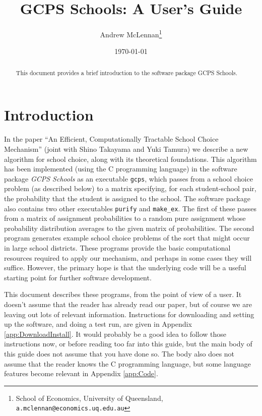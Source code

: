 \documentclass[12pt]{article}
\theoremstyle{definition}
\begin{document}
\title{GCPS Schools: A User's Guide}

\author{Andrew McLennan\footnote{School of Economics, University of
    Queensland, {\tt a.mclennan@economics.uq.edu.au}}}

\date{\today}

\maketitle

\begin{abstract}
This document provides a brief introduction to the software package GCPS Schools.
\end{abstract}


\section{Introduction}

In the paper ``An Efficient, Computationally Tractable School Choice
Mechanism'' (joint with Shino Takayama and Yuki Tamura) we describe a
new algorithm for school choice, along with its theoretical
foundations.  This algorithm has been implemented (using the C
programming language) in the software package \emph{GCPS Schools} as
an executable \texttt{gcps}, which passes from a school choice problem
(as described below) to a matrix specifying, for each student-school
pair, the probability that the student is assigned to the school.  The
software package also contains two other executables \texttt{purify}
and \texttt{make\_ex}.  The first of these passes from a matrix of
assignment probabilities to a random pure assignment whose probability
distribution averages to the given matrix of probabilities.  The
second program generates example school choice problems of the sort
that might occur in large school districts.  These programs provide
the basic computational resources required to apply our mechanism, and
perhaps in some cases they will suffice.  However, the primary hope is
that the underlying code will be a useful starting point for further
software development.

This document describes these programs, from the point of view of a
user.  It doesn't assume that the reader has already read our paper,
but of course we are leaving out lots of relevant information.
Instructions for downloading and setting up the software, and doing a
test run, are given in Appendix \ref{app:DownloadInstall}.  It would
probably be a good idea to follow those instructions now, or before
reading too far into this guide, but the main body of this guide does
not assume that you have done so.  The body also does not assume that
the reader knows the C programming language, but some language
features become relevant in Appendix \ref{app:Code}.
\end{document}
